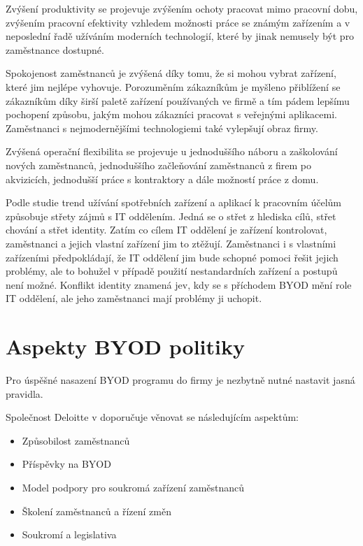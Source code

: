 Zvýšení produktivity se projevuje zvýšením ochoty pracovat mimo pracovní dobu, zvýšením pracovní efektivity vzhledem možnosti práce se známým zařízením a v neposlední řadě užíváním moderních technologií, které by jinak nemusely být pro zaměstnance dostupné. 

Spokojenost zaměstnanců je zvýšená díky tomu, že si mohou vybrat zařízení, které jim nejlépe vyhovuje. Porozuměním zákazníkům je myšleno přiblížení se zákazníkům díky širší paletě zařízení používaných ve firmě a tím pádem lepšímu pochopení způsobu, jakým mohou zákazníci pracovat s veřejnými aplikacemi. Zaměstnanci s nejmodernějšími technologiemi také vylepšují obraz firmy.

Zvýšená operační flexibilita se projevuje u jednoduššího náboru a zaškolování nových zaměstnanců, jednoduššího začleňování zaměstnanců z firem po akvizicích, jednodušší práce s kontraktory a dále možností práce z domu.


Podle studie \cite{koch2014consumerization} trend užívání spotřebních zařízení a aplikací k pracovním účelům způsobuje střety zájmů s IT oddělením. Jedná se o střet z hlediska cílů, střet chování a střet identity. Zatím co cílem IT oddělení je zařízení kontrolovat, zaměstnanci a jejich vlastní zařízení jim to ztěžují. Zaměstnanci i s vlastními zařízeními předpokládají, že IT oddělení jim bude schopné pomoci řešit jejich problémy, ale to bohužel v případě použití nestandardních zařízení a postupů není možné. Konflikt identity znamená jev, kdy se s příchodem BYOD mění role IT oddělení, ale jeho zaměstnanci mají problémy ji uchopit.

\section{Aspekty BYOD politiky}

Pro úspěšné nasazení BYOD programu do firmy je nezbytně nutné nastavit jasná pravidla.

Společnost Deloitte v \cite{DeloitteBYOD} doporučuje věnovat se následujícím aspektům:
\begin{itemize}\label{deloitte_aspekty}
\item Způsobilost zaměstnanců
\item Příspěvky na BYOD
\item Model podpory pro soukromá zařízení zaměstnanců
\item Školení zaměstnanců a řízení změn
\item Soukromí a legislativa
\end{itemize}

